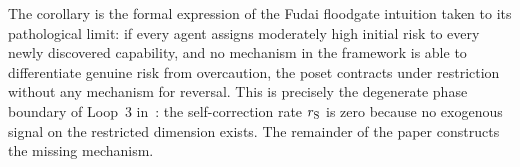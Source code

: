 The corollary is the formal expression of the Fudai floodgate
intuition taken to its pathological limit: if every agent assigns
moderately high initial risk to every newly discovered
capability, and no mechanism in the framework is able to
differentiate genuine risk from overcaution, the poset contracts
under restriction without any mechanism for reversal.  This is
precisely the degenerate phase boundary of Loop~3
in~\citep[Proposition~4]{lasser2026phase}: the self-correction
rate $r_{\mathrm{S}}$ is zero because no exogenous signal on the restricted
dimension exists.  The remainder of the paper constructs the
missing mechanism.
